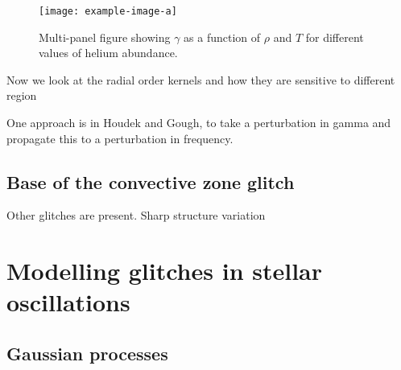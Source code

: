 \begin{figure}
    \centering
    \texttt{[image: example-image-a]}
    \caption{Multi-panel figure showing \(\gamma\) as a function of \(\rho\) and \(T\) for different values of helium abundance.}
    \label{fig:gamma-temp-density}
\end{figure}

Now we look at the radial order kernels and how they are sensitive to different region


One approach is in Houdek and Gough, to take a perturbation in gamma and propagate this to a perturbation in frequency.

\subsection{Base of the convective zone glitch}\label{sec:bcz-glitch}

Other glitches are present. Sharp structure variation

\section[Modelling the glitch]{Modelling glitches in stellar oscillations}


\subsection{Gaussian processes }\label{sec:glitch-gp}

